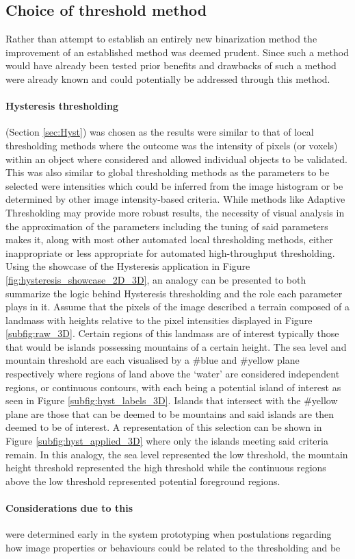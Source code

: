 \subsection{Choice of threshold method} \label{sec:thresh_choice}
Rather than attempt to establish an entirely new binarization method the improvement of an established method was deemed prudent. Since such a method would have already been tested prior benefits and drawbacks of such a method were already known and could potentially be addressed through this method. \paragraph{Hysteresis thresholding}(Section \ref{sec:Hyst}) was chosen as the results were similar to that of local thresholding methods where the outcome was the intensity of pixels (or voxels) within an object where considered and allowed individual objects to be validated. This was also similar to global thresholding methods as the parameters to be selected were intensities which could be inferred from the image histogram or be determined by other image intensity-based criteria. While methods like Adaptive Thresholding may provide more robust results, the necessity of visual analysis in the approximation of the parameters including the tuning of said parameters makes it, along with most other automated local thresholding methods, either inappropriate or less appropriate for automated high-throughput thresholding. Using the showcase of the Hysteresis application in Figure \ref{fig:hysteresis_showcase_2D_3D}, an analogy can be presented to both summarize the logic behind Hysteresis thresholding and the role each parameter plays in it. Assume that the pixels of the image described a terrain composed of a landmass with heights relative to the pixel intensities displayed in Figure \ref{subfig:raw_3D}. Certain regions of this landmass are of interest typically those that would be islands possessing mountains of a certain height. The sea level and mountain threshold are each visualised by a \#blue and \#yellow plane respectively where regions of land above the `water' are considered independent regions, or continuous contours, with each being a potential island of interest as seen in Figure \ref{subfig:hyst_labels_3D}. Islands that intersect with the \#yellow plane are those that can be deemed to be mountains and said islands are then deemed to be of interest. A representation of this selection can be shown in Figure \ref{subfig:hyst_applied_3D} where only the islands meeting said criteria remain. In this analogy, the sea level represented the low threshold, the mountain height threshold represented the high threshold while the continuous regions above the low threshold represented potential foreground regions. \paragraph{Considerations due to this} were determined early in the system prototyping when postulations regarding how image properties or behaviours could be related to the thresholding and be 